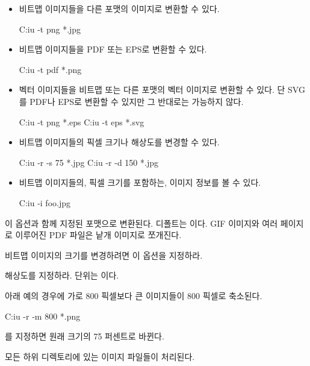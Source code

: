 \begin{itemize}

\item 비트맵 이미지들을 다른 포맷의 이미지로 변환할 수 있다.

\begin{code}
C:\>iu -t png *.jpg
\end{code}

\item 비트맵 이미지들을 PDF 또는 EPS로 변환할 수 있다.

\begin{code}
C:\>iu -t pdf *.png
\end{code}

\item 벡터 이미지들을 비트맵 또는 다른 포맷의 벡터 이미지로 변환할 수 있다.
단 SVG를 PDF나 EPS로 변환할 수 있지만 그 반대로는 가능하지 않다.

\begin{code}
C:\>iu -t png *.eps
C:\>iu -t eps *.svg
\end{code}

\item 비트맵 이미지들의 픽셀 크기나 해상도를 변경할 수 있다.

\begin{code}
C:\>iu -r -s 75 *.jpg
C:\>iu -r -d 150 *.jpg
\end{code}

\item 비트맵 이미지들의, 픽셀 크기를 포함하는, 이미지 정보를 볼 수 있다.

\begin{code}
C:\>iu -i foo.jpg
\end{code}
\end{itemize}

\begin{macros}
\item[-t] 이 옵션과 함께 지정된 포맷으로 변환된다. 
디폴트는 이다.
GIF 이미지와 여러 페이지로 이루어진 PDF 파일은 낱개 이미지로 쪼개진다. 

\item[-r] 비트맵 이미지의 크기를 변경하려면 이 옵션을 지정하라.

\item[-d] 해상도를 지정하라. 단위는 이다.

\item[-m] 아래 예의 경우에 가로 800 픽셀보다 큰 이미지들이 800 픽셀로 축소된다.
\begin{code}
C:\>iu -r -m 800 *.png
\end{code}

\item[-s] 를 지정하면 원래 크기의 75 퍼센트로 바뀐다.

\item[-R] 모든 하위 디렉토리에 있는 이미지 파일들이 처리된다.
\end{macros}

